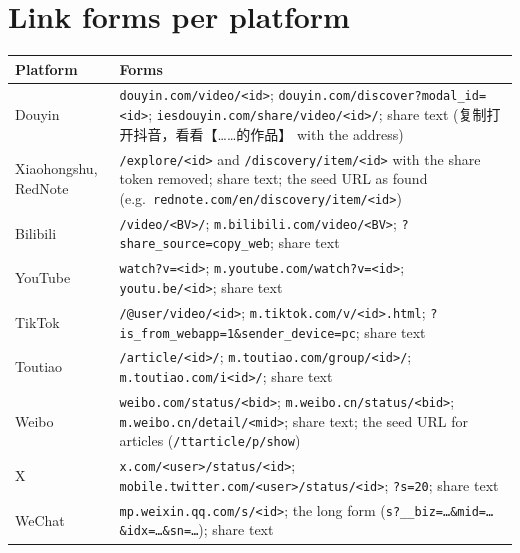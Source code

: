 \documentclass[11pt]{article}
\newcommand{\zh}[1]{#1}
\DeclareRobustCommand{\zh}[1]{\begin{CJK}{UTF8}{gbsn}#1\end{CJK}}
\begin{document}


\section{Link forms per platform}\label{app:forms}
\begin{center}\begin{minipage}{\textwidth}\centering\small
{}
\label{tab:linkforms}
\begin{tabular}{@{}l p{12.2cm}@{}}
\toprule
Platform & Forms \\
\midrule
Douyin & \texttt{douyin.com/video/<id>}; \texttt{douyin.com/discover?modal\_id=<id>};
  \texttt{iesdouyin.com/share/video/<id>/}; share text (\zh{复制打开抖音，看看【……的作品】} with the address) \\
Xiaohongshu, RedNote & \texttt{/explore/<id>} and \texttt{/discovery/item/<id>} with the share token removed; share
  text; the seed URL as found (e.g.\ \texttt{rednote.com/en/discovery/item/<id>}) \\
Bilibili & \texttt{/video/<BV>/}; \texttt{m.bilibili.com/video/<BV>}; \texttt{?share\_source=copy\_web}; share text \\
YouTube & \texttt{watch?v=<id>}; \texttt{m.youtube.com/watch?v=<id>}; \texttt{youtu.be/<id>}; share text \\
TikTok & \texttt{/@user/video/<id>}; \texttt{m.tiktok.com/v/<id>.html}; \texttt{?is\_from\_webapp=1\&sender\_device=pc};
  share text \\
Toutiao & \texttt{/article/<id>/}; \texttt{m.toutiao.com/group/<id>/}; \texttt{m.toutiao.com/i<id>/}; share text \\
Weibo & \texttt{weibo.com/status/<bid>}; \texttt{m.weibo.cn/status/<bid>}; \texttt{m.weibo.cn/detail/<mid>}; share
  text; the seed URL for articles (\texttt{/ttarticle/p/show}) \\
X & \texttt{x.com/<user>/status/<id>}; \texttt{mobile.twitter.com/<user>/status/<id>}; \texttt{?s=20}; share text \\
WeChat & \texttt{mp.weixin.qq.com/s/<id>}; the long form (\texttt{s?\_\_biz=…\&mid=…\&idx=…\&sn=…}); share text \\
\bottomrule
\end{tabular}
\end{minipage}\end{center}
\end{document}
